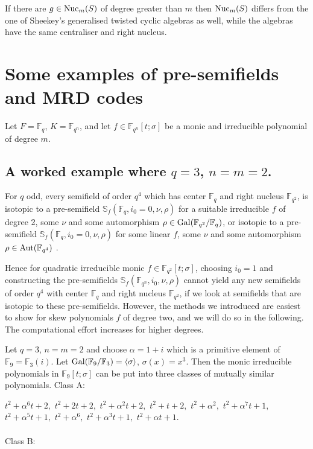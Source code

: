 \documentclass[12pt]{amsart}
\theoremstyle{plain}
\theoremstyle{definition}
\numberwithin{equation}{section}
\numberwithin{figure}{section}
\newcommand{\ignore}[1]{}
\begin{document}
If there are $g\in  {\rm Nuc}_m(S)$ of degree greater than $m$ then $ {\rm Nuc}_m(S)$  differs from the one of Sheekey's generalised twisted cyclic algebras as well, while the algebras have the same centraliser and right nucleus.


\section{Some examples of pre-semifields and MRD codes} \label{sec:finite fields}

Let $F=\mathbb{F}_q$, $K=\mathbb{F}_{q^n}$, and let $f\in \mathbb{F}_{q^n}[t;\sigma]$ be a monic and irreducible polynomial of degree $m$.


 \subsection{A worked example where $q=3$, $n=m=2$.} \label{sec:ex}

  For $q$ odd, every semifield of order $q^4$ which has center $\mathbb{F}_{q}$ and right nucleus $\mathbb{F}_{q^2}$, is isotopic to a pre-semifield $\mathbb{S}_f(\mathbb{F}_{q},i_0=0,\nu,\rho)$
  for a suitable irreducible $f$ of degree 2, some $\nu$ and some automorphism $\rho\in {\rm Gal}(\mathbb{F}_{q^2}/\mathbb{F}_{q})$, or isotopic to a pre-semifield $\mathbb{S}_f(\mathbb{F}_{q},i_0=0,\nu,\rho)$ for some linear $f$, some $\nu$ and some automorphism $\rho\in {\rm Aut}(\mathbb{F}_{q^4})$ \cite[Theorem 8]{Sheekey}.

   Hence for quadratic irreducible monic $f\in \mathbb{F}_{q^2}[t;\sigma]$,  choosing $i_0=1$  and constructing the pre-semifields $\mathbb{S}_f(\mathbb{F}_{q^n},i_0,\nu,\rho)$ cannot yield any new semifields  of order $q^4$ with center $\mathbb{F}_{q}$ and right nucleus $\mathbb{F}_{q^2}$, if we look at semifields that are isotopic to these pre-semifields. However, the methods we introduced are easiest to show for skew polynomials $f$ of degree two, and we will do so in the following. The computational effort increases for higher degrees.


 Let $q=3$, $n=m=2$ and choose $\alpha=1+i$ which is a primitive element of $\mathbb{F}_9=\mathbb{F}_3(i)$. Let ${\rm Gal}(\mathbb{F}_9/\mathbb{F}_3)=\langle \sigma \rangle$, $\sigma(x)=x^3$. Then the monic irreducible polynomials in $\mathbb{F}_9[t;\sigma]$ can be put into three classes of mutually similar polynomials.
\newpage
Class A:

        \ignore{$t^2 + \alpha^6t + 2,$

        $t^2 + 2t + 2,$
$t^2 + \alpha^2t+ 2,$
$t^2 + t + 2,$
$t^2 + \alpha^2,$
$t^2 + \alpha^7t + 1,$
$t^2 + \alpha^5t + 1,$
$t^2 + \alpha^6,$
$t^2 + \alpha^3t + 1,$
$ t^2 + \alpha t + 1$.}
$t^2 + \alpha^6t + 2,$
$t^2 + 2t + 2,$
$t^2 + \alpha^2t+ 2,$ $t^2 + t + 2,$
$t^2 + \alpha^2,$
$t^2 + \alpha^7t + 1,$
$t^2 + \alpha^5t + 1,$
$t^2 + \alpha^6,$
$t^2 + \alpha^3t + 1,$
$ t^2 + \alpha t + 1$.
\\\\
     Class B:
\end{document}
